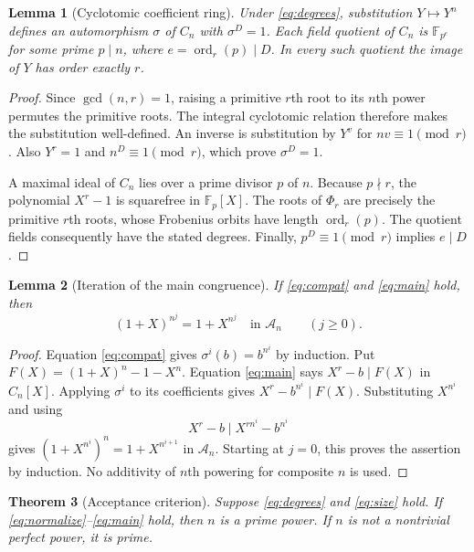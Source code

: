 \documentclass[11pt]{article}
\newtheorem{theorem}{Theorem}[section]
\newtheorem{lemma}[theorem]{Lemma}
\theoremstyle{definition}
\theoremstyle{remark}
\newcommand{\F}{\mathbb F}
\newcommand{\ord}{\operatorname{ord}}
\newcommand{\A}{\mathcal A}
\begin{document}
\begin{lemma}[Cyclotomic coefficient ring]\label{lem:ring}
Under \eqref{eq:degrees}, substitution $Y\mapsto Y^n$ defines an
automorphism $\sigma$ of $C_n$ with $\sigma^D=1$. Each field quotient
of $C_n$ is $\F_{p^e}$ for some prime $p\mid n$, where
$e=\ord_r(p)\mid D$. In every such quotient the image of $Y$ has
order exactly $r$.
\end{lemma}

\begin{proof}
Since $\gcd(n,r)=1$, raising a primitive $r$th root to its $n$th power
permutes the primitive roots. The integral cyclotomic relation therefore
makes the substitution well-defined. An inverse is substitution by
$Y^v$ for $nv\equiv1\pmod r$. Also $Y^r=1$ and $n^D\equiv1\pmod r$,
which prove $\sigma^D=1$.

A maximal ideal of $C_n$ lies over a prime divisor $p$ of $n$.
Because $p\nmid r$, the polynomial $X^r-1$ is squarefree in
$\F_p[X]$. The roots of $\Phi_r$ are precisely the primitive
$r$th roots, whose Frobenius orbits have length $\ord_r(p)$.
The quotient fields consequently have the stated degrees. Finally,
$p^D\equiv1\pmod r$ implies $e\mid D$.
\end{proof}

\begin{lemma}[Iteration of the main congruence]\label{lem:iteration}
If \eqref{eq:compat} and \eqref{eq:main} hold, then
\[
 (1+X)^{n^j}=1+X^{n^j}\quad\text{in }\A_n
 \qquad(j\ge0).
\]
\end{lemma}

\begin{proof}
Equation \eqref{eq:compat} gives $\sigma^i(b)=b^{n^i}$ by induction.
Put $F(X)=(1+X)^n-1-X^n$. Equation \eqref{eq:main} says
$X^r-b\mid F(X)$ in $C_n[X]$. Applying $\sigma^i$ to its
coefficients gives $X^r-b^{n^i}\mid F(X)$. Substituting $X^{n^i}$
and using
\[
 X^r-b\mid X^{rn^i}-b^{n^i}
\]
gives $(1+X^{n^i})^n=1+X^{n^{i+1}}$ in $\A_n$. Starting at
$j=0$, this proves the assertion by induction. No additivity of
$n$th powering for composite $n$ is used.
\end{proof}

\begin{theorem}[Acceptance criterion]\label{thm:criterion}
Suppose \eqref{eq:degrees} and \eqref{eq:size} hold. If
\eqref{eq:normalize}--\eqref{eq:main} hold, then $n$ is a prime
power. If $n$ is not a nontrivial perfect power, it is prime.
\end{theorem}
\end{document}
